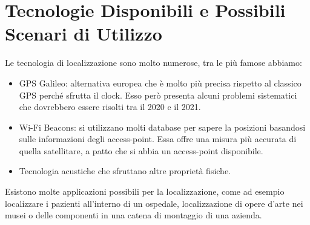         \section{Tecnologie Disponibili e Possibili Scenari di
Utilizzo}\label{subsec3.2}
        Le tecnologia di localizzazione sono molto numerose, tra le più famose
abbiamo:
        \begin{itemize}
                \item GPS Galileo: alternativa europea che è molto più precisa
rispetto al classico GPS perché sfrutta il clock. Esso però presenta alcuni
problemi sistematici che dovrebbero essere risolti tra il 2020 e il 2021.
                \item Wi-Fi Beacons: si utilizzano molti database per sapere la
posizioni basandosi sulle informazioni degli access-point. Essa offre una misura
più accurata di quella satellitare, a patto che si abbia un access-point
disponibile.
                \item Tecnologia acustiche che sfruttano altre proprietà
fisiche.
        \end{itemize}

        Esistono molte applicazioni possibili per la localizzazione, come ad
esempio localizzare i pazienti all'interno di un ospedale, localizzazione di
opere d'arte nei musei o delle componenti in una catena di montaggio di una
azienda.

